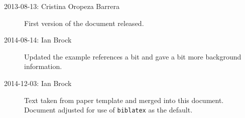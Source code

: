 \documentclass[UKenglish]{latex/atlasdoc}
\newcommand{\Package}[1]{\texttt{#1}\xspace}
\begin{document}
\begin{description}
\item[2013-08-13: Cristina Oropeza Barrera] First version of the document released.
\item[2014-08-14: Ian Brock] Updated the example references a bit and gave a bit more background information.
\item[2014-12-03: Ian Brock] Text taken from paper template and merged into this document. 
  Document adjusted for use of \Package{biblatex} as the default.
\end{description}

\printbibliography
%
%
\end{document}
